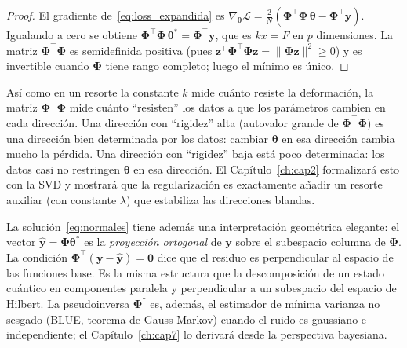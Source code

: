\begin{proof}
El gradiente de~\eqref{eq:loss_expandida} es
$\nabla_{\bm{\theta}}\mathcal{L} = \frac{2}{N}(\bm{\Phi}^\top\bm{\Phi}\,
\bm{\theta} - \bm{\Phi}^\top\bm{y})$. Igualando a cero se obtiene
$\bm{\Phi}^\top\bm{\Phi}\,\bm{\theta}^* = \bm{\Phi}^\top\bm{y}$, que es
$kx = F$ en $p$ dimensiones. La matriz $\bm{\Phi}^\top\bm{\Phi}$ es
semidefinida positiva (pues
$\bm{z}^\top\bm{\Phi}^\top\bm{\Phi}\bm{z} = \|\bm{\Phi}\bm{z}\|^2
\geq 0$) y es invertible cuando $\bm{\Phi}$ tiene rango completo; luego el
mínimo es único.
\end{proof}

Así como en un resorte la constante $k$ mide cuánto resiste la deformación,
la matriz $\bm{\Phi}^\top\bm{\Phi}$ mide cuánto ``resisten'' los datos a
que los parámetros cambien en cada dirección. Una dirección con ``rigidez''
alta (autovalor grande de $\bm{\Phi}^\top\bm{\Phi}$) es una dirección bien
determinada por los datos: cambiar $\bm{\theta}$ en esa dirección cambia
mucho la pérdida. Una dirección con ``rigidez'' baja está poco determinada:
los datos casi no restringen $\bm{\theta}$ en esa dirección. El
Capítulo~\ref{ch:cap2} formalizará esto con la SVD y mostrará que la
regularización es exactamente añadir un resorte auxiliar (con constante
$\lambda$) que estabiliza las direcciones blandas.

La solución~\eqref{eq:normales} tiene además una interpretación geométrica
elegante: el vector $\hat{\bm{y}} = \bm{\Phi}\bm{\theta}^*$ es la
\emph{proyección ortogonal} de $\bm{y}$ sobre el subespacio columna de
$\bm{\Phi}$. La condición $\bm{\Phi}^\top(\bm{y}-\hat{\bm{y}}) = \bm{0}$
dice que el residuo es perpendicular al espacio de las funciones base. Es la
misma estructura que la descomposición de un estado cuántico en componentes
paralela y perpendicular a un subespacio del espacio de Hilbert. La
pseudoinversa $\bm{\Phi}^\dagger$ es, además, el estimador de mínima
varianza no sesgado (BLUE, teorema de Gauss-Markov) cuando el ruido es
gaussiano e independiente; el Capítulo~\ref{ch:cap7} lo derivará desde la
perspectiva bayesiana.


